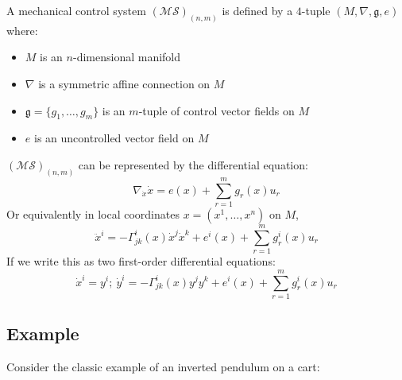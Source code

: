 \begin{defn}
    A mechanical control system $(\mathcal{MS})_{(n,m)}$ is defined by a $4$-tuple $(M, \nabla, \mathfrak{g}, e)$ where:
    \begin{itemize}
        \item $M$ is an $n$-dimensional manifold
        \item $\nabla$ is a symmetric affine connection on $M$
        \item $\mathfrak{g} = \{g_1, \dots, g_m\}$ is an $m$-tuple of control vector fields on $M$
        \item $e$ is an uncontrolled vector field on $M$
    \end{itemize}
    $(\mathcal{MS})_{(n,m)}$ can be represented by the differential equation:
    \begin{equation}
        \nabla_{\dot{x}} \dot{x} = e(x) + \sum_{r=1}^m g_r(x) u_r 
    \end{equation}
    Or equivalently in local coordinates $x = (x^1, \dots, x^n)$ on $M$, 
    \begin{equation}\label{SODE-initial}
        \ddot{x}^i = - \Gamma ^i_{jk}(x)\dot{x}^j \dot{x}^k + e^i(x) + \sum_{r=1}^m g^i_r(x)u_r
    \end{equation}
    If we write this as two first-order differential equations:
    \begin{equation}\label{SODE-nonlinear}
        \dot{x}^i  = y^i; \
        \dot{y}^i  = - \Gamma^i_{jk}(x)y^jy^k + e^i(x) + \sum_{r=1}^m g_r^i(x)u_r
    \end{equation}
\end{defn}

\newpage

\subsection{Example}

Consider the classic example of an inverted pendulum on a cart:

